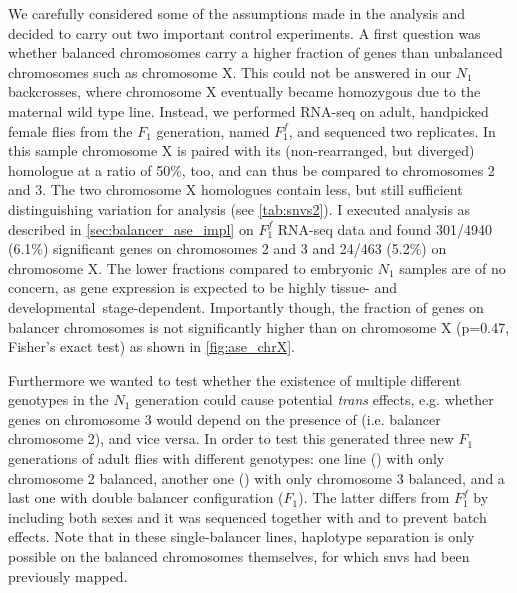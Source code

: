 We carefully considered some of the assumptions made in the \ase analysis and
decided to carry out two important control experiments. A first question was
whether balanced chromosomes carry a higher fraction of \ase genes than
unbalanced chromosomes such as chromosome X.
This could not be answered in our
$N_1$ backcrosses, where chromosome X eventually became homozygous due to the
maternal wild type line. Instead, we performed RNA-seq on adult, handpicked
female flies from the $F_1$ generation, named $F_1^f$, and sequenced two
replicates. In this sample chromosome X is paired with its (non-rearranged,
but diverged) homologue at a ratio of 50\%, too, and can thus be compared to
chromosomes 2 and 3. The two chromosome X homologues contain less, but still
sufficient distinguishing variation for \ase analysis (see \cref{tab:snvs2}).
I executed \ase analysis as described in \cref{sec:balancer_ase_impl} on $F_1^f$
RNA-seq data and found 301/4940 (6.1\%) significant \ase genes on chromosomes
2 and 3 and 24/463 (5.2\%) on chromosome X. The lower fractions compared to
embryonic $N_1$ samples are of no concern, as gene expression is expected to
be highly tissue- and developmental\ stage-dependent. Importantly though, the
fraction of \ase genes on balancer chromosomes is not significantly higher than
on chromosome X (p=0.47, Fisher’s exact test) as shown in \cref{fig:ase_chrX}.

Furthermore we wanted to test whether the existence of multiple different
genotypes in the $N_1$ generation could cause potential \textit{trans} effects,
e.g. whether genes on chromosome 3 would depend on the presence of \cyo
(i.e. balancer chromosome 2), and vice versa. In order to test this \yad generated
three new $F_1$ generations of adult flies with different genotypes: one line
(\Fcyo) with only chromosome 2 balanced, another one (\Ftm) with only
chromosome 3 balanced, and a last one with double balancer configuration ($F_1$).
The latter differs from $F_1^f$ by including both sexes and it was sequenced
together with \Fcyo and \Ftm to prevent batch effects. Note that
in these single-balancer lines, haplotype separation is only
possible on the balanced chromosomes themselves, for which \acp{snv} had been
previously mapped.

